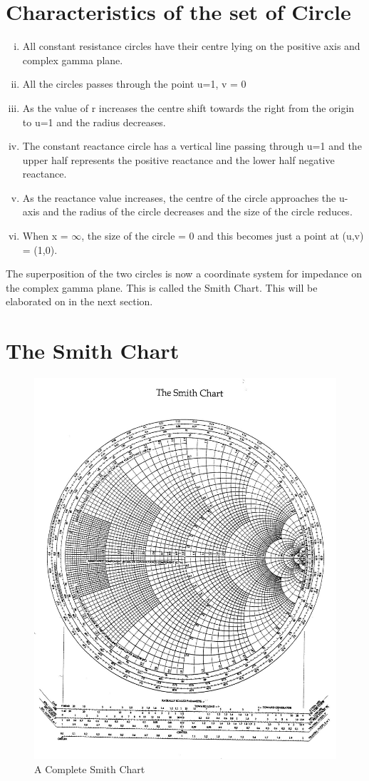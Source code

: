 \section{Characteristics of the set of Circle}
\begin{enumerate}[(i)]
\item All constant resistance circles have their centre lying on the positive axis and complex gamma plane.
\item All the circles passes through the point u=1, v = 0
\item As the value of r increases the centre shift towards the right from the origin to u=1 and the radius decreases.
\item The constant reactance circle has a vertical line passing through u=1 and the upper half represents the positive reactance and the lower half negative reactance.
\item As the reactance value increases, the centre of the circle approaches the u-axis and the radius of the circle decreases and the size of the circle reduces.
\item When x = $\infty$, the size of the circle = 0  and this  becomes just a point at (u,v) = (1,0).
\end{enumerate}

The superposition of the two circles is now a coordinate system for impedance on the complex gamma plane. This is called the Smith Chart.  This will be elaborated on in  the next section.
\section{\textbf{The Smith Chart}}
\begin{figure}[h]
\centering
\includegraphics[width=0.7\linewidth]{"./graphics/smith_chart (2)"}
\caption{A Complete Smith Chart}
\label{fig:smithchart-2}
\end{figure}

